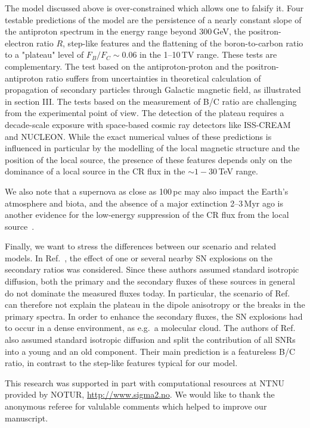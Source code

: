 \documentclass[prd,aps,twocolumn]{revtex4}
\begin{document}
The model discussed above is over-constrained which allows one to falsify it. 
Four testable predictions of the model are the persistence of a 
nearly constant slope of the antiproton spectrum  in the energy range beyond 
300\,GeV, the positron-electron ratio $R$, step-like features and the 
flattening of the boron-to-carbon 
ratio to a "plateau" level of $F_B/F_C\sim 0.06$ in the 1--10\,TV range. 
These tests are complementary. The test based on the antiproton-proton 
and the positron-antiproton ratio suffers from uncertainties in theoretical  
calculation of propagation of secondary particles through Galactic magnetic field, as illustrated in section III. The tests based on the 
measurement of B/C ratio are challenging from the experimental point of 
view. The detection of the plateau requires a decade-scale exposure with 
space-based cosmic ray detectors like ISS-CREAM and NUCLEON. 
%
While the exact numerical values of these predictions is influenced
in particular by the modelling of the local magnetic structure and
the position of the local source, the presence of these features depends 
only on the dominance of a local source in the CR flux in the 
$\sim 1-30$\,TeV range.


We also note that a supernova as close as 100\,pc may also impact
the Earth's atmosphere and biota, and the absence of a major extinction
2--3\,Myr ago is another evidence for the low-energy suppression
of the CR flux from the local source~\cite{bio}.

Finally, we want to stress the differences between our scenario and related
models. In Ref.~\cite{Fujita:2009wk}, the effect of one or several nearby SN
explosions on the secondary ratios was considered. Since these authors
assumed standard isotropic diffusion, both the primary and the secondary
fluxes of these sources in general do not dominate the measured fluxes today.
In particular, the scenario of  Ref.~\cite{Fujita:2009wk} can therefore not
explain the plateau in the dipole anisotropy or the breaks in the primary
spectra. In order to enhance the secondary fluxes, the SN explosions had to
occur in a dense environment, as e.g.\ a molecular cloud. 
The authors of Ref.~\cite{reac2} also assumed standard isotropic
diffusion and split the contribution of all SNRs into a young and an old
component. Their main prediction is a featureless B/C ratio, in contrast
to the step-like features typical for our model.





\acknowledgments
%
This research was supported in part with computational resources at NTNU 
provided by NOTUR, \url{http://www.sigma2.no}. We would like to thank the
anonymous referee for valulable comments which helped to improve our 
manuscript.
\end{document}
